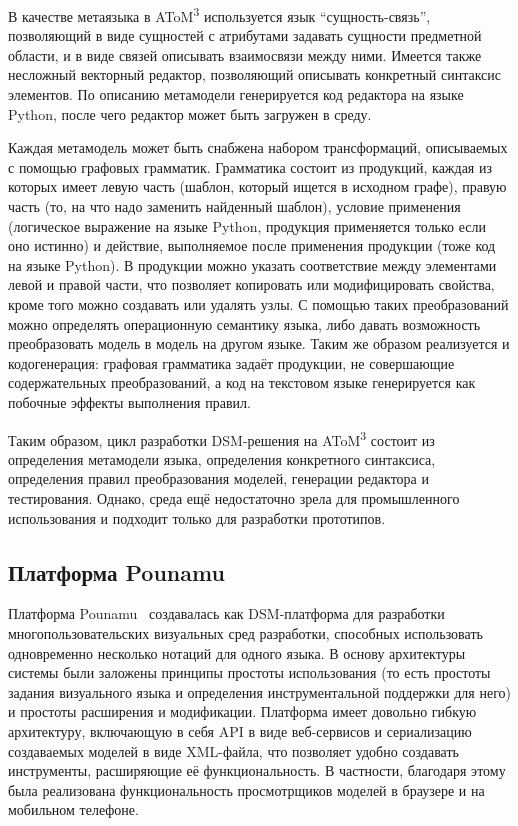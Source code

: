 В качестве метаязыка в AToM\textsuperscript{3} используется язык "`сущность-связь"', позволяющий в виде 
сущностей с атрибутами задавать сущности предметной области, и в виде связей описывать 
взаимосвязи между ними. Имеется также несложный векторный редактор, позволяющий описывать 
конкретный синтаксис элементов. По описанию метамодели генерируется код редактора 
на языке Python, после чего редактор может быть загружен в среду. 

Каждая метамодель может быть снабжена набором трансформаций, описываемых с помощью 
графовых грамматик. Грамматика состоит из продукций, каждая из которых имеет левую 
часть (шаблон, который ищется в исходном графе), правую часть (то, на что надо заменить 
найденный шаблон), условие применения (логическое выражение на языке Python, продукция 
применяется только если оно истинно) и действие, выполняемое после применения продукции 
(тоже код на языке Python). В продукции можно указать соответствие между элементами 
левой и правой части, что позволяет копировать или модифицировать свойства, кроме 
того можно создавать или удалять узлы. С помощью таких преобразований можно определять 
операционную семантику языка, либо давать возможность преобразовать модель в модель 
на другом языке. Таким же образом реализуется и кодогенерация: графовая грамматика 
задаёт продукции, не совершающие содержательных преобразований, а код на текстовом 
языке генерируется как побочные эффекты выполнения правил.

Таким образом, цикл разработки DSM-решения на AToM\textsuperscript{3} состоит из определения метамодели 
языка, определения конкретного синтаксиса, определения правил преобразования моделей, 
генерации редактора и тестирования. Однако, среда ещё недостаточно зрела для промышленного 
использования и подходит только для разработки прототипов.

\subsection{Платформа Pounamu}
Платформа Pounamu~\cite{zhu2007pounamu} создавалась как DSM-платформа для разработки 
многопользовательских визуальных сред разработки, способных использовать одновременно 
несколько нотаций для одного языка. В основу архитектуры системы были заложены принципы 
простоты использования (то есть простоты задания визуального языка и определения инструментальной 
поддержки для него) и простоты расширения и модификации. Платформа имеет довольно 
гибкую архитектуру, включающую в себя API в виде веб-сервисов и сериализацию создаваемых 
моделей в виде XML-файла, что позволяет удобно создавать инструменты, расширяющие её 
функциональность. В частности, благодаря этому была реализована функциональность просмотрщиков 
моделей в браузере и на мобильном телефоне.

